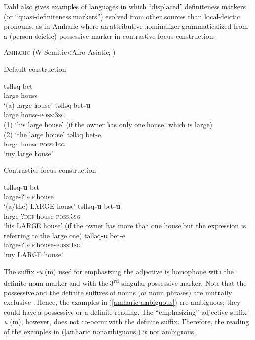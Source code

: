 {Dahl also gives examples of languages in which “displaced” definiteness markers (or “quasi-definiteness markers”) evolved from other sources than local-deictic pronouns, as in Amharic where an attributive nominalizer grammaticalized from a (person-deictic) possessive marker in contrastive-focus construction.
\begin{exe}
\ex	\textsc{Amharic} (W-Semitic<Afro-Asiatic; \citealt{hudson1997})
\begin{xlist}
\ex	Default construction
\begin{xlist}
\ex
\gll	təlləq bet\\
	large	house\\								
\glt	‘(a) large house’
\ex	\label{amharic ambiguous}
\gll	təlləq bet\textbf{-u}\\
	large house-\textsc{poss:3sg}\\
\glt	(1) ‘his large house’ (if the owner has only one house, which is large)\\
	(2) ‘the large house’
\ex
\gll	təlləq bet-e\\
	large house-\textsc{poss:1sg}\\
\glt	‘my large house’
\end{xlist}
\ex	Contrastive-focus construction
\begin{xlist}
\ex	
\gll	təlləq\textbf{-u} bet\\
	large-\textsc{?def} house\\
\glt	‘(a/the) LARGE house’
\ex	\label{amharic nonambiguous}
\gll	təlləq\textbf{-u} bet\textbf{-u}\\
	large-\textsc{?def} house-\textsc{poss:3sg}\\
\glt	‘his LARGE house’ (if the owner has more than one house but the expression is referring to the large one)
\ex
\gll	təlləq\textbf{-u} bet-e\\
	large-\textsc{?def} house-\textsc{poss:1sg}\\
\glt	‘my LARGE house’
\end{xlist}
\end{xlist}
\end{exe}
The suffix \textit{-u} ({\sc m}) used for emphasizing the adjective is homophone with the definite noun marker and with the 3\textsuperscript{rd} singular possessive marker. Note that the possessive and the definite suffixes of nouns (or noun phrases) are mutually exclusive \citep[463]{hudson1997}. Hence, the examples in (\ref{amharic ambiguous}) are ambiguous; they could have a possessive or a definite reading. The “emphasizing” adjective suffix \textit{-u} ({\sc m}), however, does not co-occur with the definite suffix. Therefore, the reading of the examples in (\ref{amharic nonambiguous}) is not ambiguous.

}
